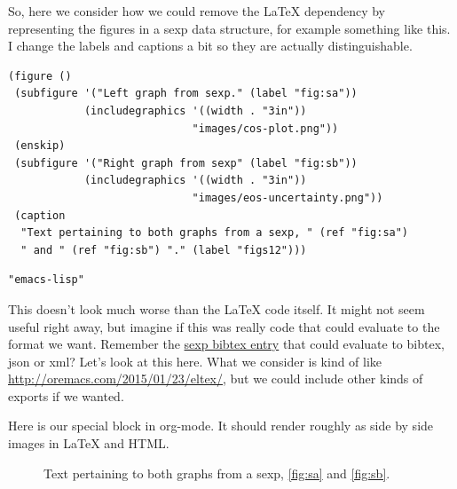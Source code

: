 \documentclass[11pt]{article}
\begin{document}
So, here we consider how we could remove the \LaTeX{} dependency by representing the figures in a sexp data structure, for example something like this. I change the labels and captions a bit so they are actually distinguishable.

\begin{verbatim}
(figure ()
 (subfigure '("Left graph from sexp." (label "fig:sa"))
            (includegraphics '((width . "3in"))
                             "images/cos-plot.png"))
 (enskip)
 (subfigure '("Right graph from sexp" (label "fig:sb"))
            (includegraphics '((width . "3in"))
                             "images/eos-uncertainty.png"))
 (caption
  "Text pertaining to both graphs from a sexp, " (ref "fig:sa")
  " and " (ref "fig:sb") "." (label "figs12")))
\end{verbatim}

\begin{verbatim}
"emacs-lisp"
\end{verbatim}

This doesn't look much worse than the \LaTeX{} code itself. It might not seem useful right away, but imagine if this was really code that could evaluate to the format we want. Remember the \href{http://kitchingroup.cheme.cmu.edu/blog/2015/06/10/A-sexp-version-of-a-bibtex-entry/}{sexp bibtex entry} that could evaluate to bibtex, json or xml? Let's look at this here. What we consider is kind of like \url{http://oremacs.com/2015/01/23/eltex/}, but we could include other kinds of exports if we wanted.

Here is our special block in org-mode. It should render roughly as side by side images in \LaTeX{} and HTML.

\begin{figure}
\enskip
{}
\caption{Text pertaining to both graphs from a sexp, \ref{fig:sa} and \ref{fig:sb}.\label{figs12}}
\end{figure}
\end{document}
